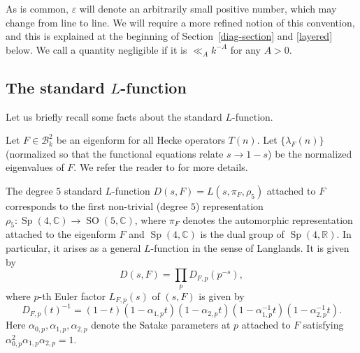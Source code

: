 \documentclass[11pt]{amsart}
\numberwithin{equation}{section}
\theoremstyle{plain}
\theoremstyle{definition}
\newcommand{\R}{\mathbb{R}}
\newcommand{\C}{\mathbb{C}}
\newcommand{\SO}{\operatorname{SO}}
\newcommand{\Sp}{\operatorname{Sp}}
\numberwithin{equation}{section}
\begin{document}
As is common, $\varepsilon$ will denote an arbitrarily small positive number, which may change from line to line. We will require a more refined notion of this convention, and this is explained at the beginning of Section~\ref{diag-section} and \eqref{layered} below. We call a quantity negligible if it is $\ll_A k^{-A}$ for any $A > 0$. 

\subsection{The standard \texorpdfstring{$L$}{L}-function}\label{sec21}

Let us briefly recall  some facts about the standard $L$-function. %

Let $F\in \mathcal{B}_k^2$ be an eigenform for all Hecke operators $T(n)$. %
Let $\{\lambda_F(n)\}$ (normalized so that the functional equations relate $s \to 1-s$) be the normalized eigenvalues of $F$. We refer the reader to \cite{An} for more details.


The degree $5$ standard $L$-function $D(s,F)  =L(s, \pi_F, \rho_5)$ attached to $F$ corresponds to the first non-trivial (degree $5$) representation $\rho_5 \colon \Sp(4,\C) \to \SO(5,\C)$,  where $\pi_F$ denotes the automorphic representation attached to the eigenform $F$ and $\Sp(4,\C)$ is the dual group of $\Sp(4, \R)$.  In particular, it arises as a general $L$-function in the sense of Langlands. 
It is given by
\begin{equation*}
D(s, F)=\prod_{p} D_{F,p} (p^{-s}),
\end{equation*}
where $p$-th Euler factor $L_{F,p}(s)$ of $( s, F)$ is given by
\begin{equation}\label{standardp}
D_{F,p}(t)^{-1}=(1-t)(1-\alpha_{1,p}t)(1-\alpha_{2,p}t)(1-\alpha_{1,p}^{-1}t)(1-\alpha_{2,p}^{-1}t).
\end{equation}
Here $\alpha_{0,p},\alpha_{1,p},\alpha_{2,p}$ denote the Satake  parameters at $p$ attached to $F$ satisfying
$\alpha_{0,p}^2\alpha_{1,p}\alpha_{2,p}=1.$
\end{document}
